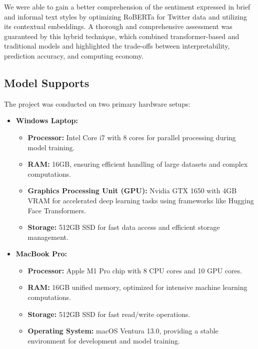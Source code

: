 \documentclass[journal]{IEEEtran}
\begin{document}
We were able to gain a better comprehension of the sentiment expressed in brief and informal text styles by optimizing RoBERTa for Twitter data and utilizing its contextual embeddings. A thorough and comprehensive assessment was guaranteed by this hybrid technique, which combined transformer-based and traditional models and highlighted the trade-offs between interpretability, prediction accuracy, and computing economy.

\subsection{\textbf{Model Supports}}
The project was conducted on two primary hardware setups:

\begin{itemize}
    \item \textbf{Windows Laptop:}
    \begin{itemize}
        \item \textbf{Processor:} Intel Core i7 with 8 cores for parallel processing during model training.
        \item \textbf{RAM:} 16GB, ensuring efficient handling of large datasets and complex computations.
        \item \textbf{Graphics Processing Unit (GPU):} Nvidia GTX 1650 with 4GB VRAM for accelerated deep learning tasks using frameworks like Hugging Face Transformers.
        \item \textbf{Storage:} 512GB SSD for fast data access and efficient storage management.
    \end{itemize}

    \item \textbf{MacBook Pro:}
    \begin{itemize}
        \item \textbf{Processor:} Apple M1 Pro chip with 8 CPU cores and 10 GPU cores.
        \item \textbf{RAM:} 16GB unified memory, optimized for intensive machine learning computations.
        \item \textbf{Storage:} 512GB SSD for fast read/write operations.
        \item \textbf{Operating System:} macOS Ventura 13.0, providing a stable environment for development and model training.
    \end{itemize}
\end{itemize}
\end{document}
